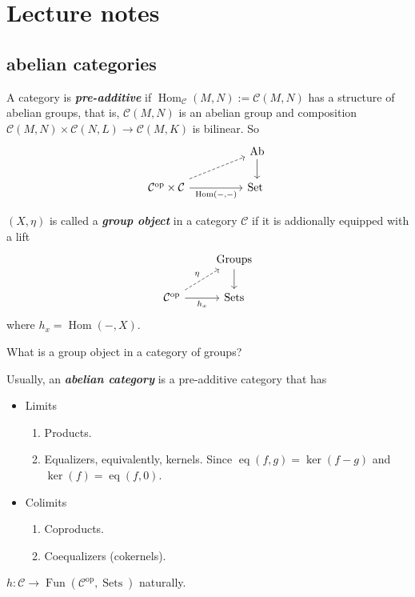 \documentclass{article}
\newcommand{\Cc}{\mathcal{C}}
\DeclareMathOperator{\Hom}{Hom}
\DeclareMathOperator{\Set}{Set}
\DeclareMathOperator{\Sets}{Sets}
\DeclareMathOperator{\Ab}{Ab}
\DeclareMathOperator{\op}{op}
\DeclareMathOperator{\Groups}{Groups}
\DeclareMathOperator{\eq}{eq}
\DeclareMathOperator{\Fun}{Fun}
\begin{document}
\section{Lecture notes}
\subsection{abelian categories}
\begin{defn}
	A category is \textbf{\textit{pre-additive}} if $\Hom_\Cc(M,N):=\Cc(M,N)$ has a structure of abelian groups, that is, $\Cc(M,N)$ is an abelian group and composition $\Cc(M,N)\times\Cc(N,L)\to\Cc(M,K)$ is bilinear. So
	\[\begin{tikzcd}[column sep=huge]
		&\Ab\arrow[d]\\
	\Cc^{\op}\times\Cc\arrow[r,"\Hom(-\text{,}-)",swap]\arrow[ur,dashed]&\Set
\	\end{tikzcd}\]
\end{defn}
\begin{defn}
	$(X,\eta)$ is called a \textbf{\textit{group object}} in a category $\Cc$ if it is addionally equipped with a lift
	\[\begin{tikzcd}
		&\Groups\arrow[d]\\		\Cc^{\op}\arrow[r,"h_x",swap]\arrow[ur,"\eta",dashed]&\Sets
	\end{tikzcd}\]
	where $h_x=\Hom(-,X)$.
\end{defn}
\begin{exercise}
	What is a group object in a category of groups?
\end{exercise}
\begin{defn}
	Usually, an \textbf{\textit{abelian category}} is a pre-additive category that has
	\begin{itemize}
		\item Limits
		\begin{enumerate}
			\item Products.
			\item Equalizers, equivalently, kernels. Since $\eq(f,g)=\ker(f-g)$ and $\ker(f)=\eq(f,0)$.
		\end{enumerate}
		\item Colimits
		\begin{enumerate}
			\item Coproducts.
			\item Coequalizers (cokernels).
		\end{enumerate}
	\end{itemize}
\end{defn}
\begin{lemma}[Yoneda]
	$h:\Cc\to\Fun(\Cc^{\op},\Sets)$ naturally.
\end{lemma}
\end{document}
